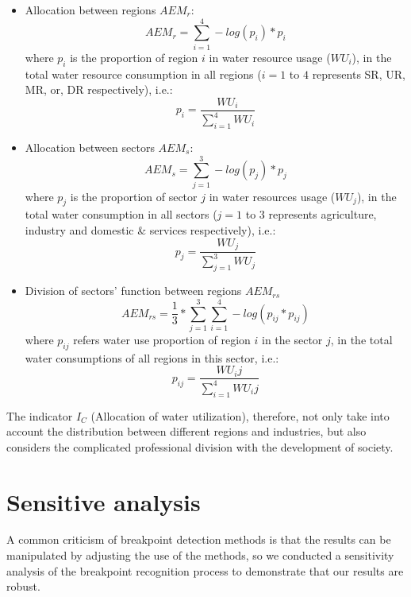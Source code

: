\documentclass[9pt,twoside,lineno]{pnas-new}
\begin{document}
    \begin{itemize}
        \item Allocation between regions $AEM_r$:
            $$ AEM_r = \sum_{i=1}^4 -log(p_{i}) * p_{i} $$
            where $p_i$ is the proportion of region $i$ in water resource usage ($WU_i$), in the total water resource consumption in all regions ($i=1$ to $4$ represents SR, UR, MR, or, DR respectively), i.e.:
            $$ p_i = \frac{WU_i}{\sum_{i=1}^4 WU_i} $$
        \item Allocation between sectors $AEM_s$:
            $$ AEM_s = \sum_{j=1}^3 -log(p_{j}) * p_{j} $$ 
            where $p_j$ is the proportion of sector $j$ in water resources usage ($WU_j$), in the total water consumption in all sectors ($j=1$ to $3$ represents agriculture, industry and domestic \& services respectively), i.e.:
            $$ p_j = \frac{WU_j}{\sum_{j=1}^3 WU_j} $$
        \item Division of sectors' function between regions $AEM_{rs}$
            $$ AEM_{rs} = \frac{1}{3} * \sum_{j=1}^3 \sum_{i=1}^4 -log(p_{ij} * p_{ij})$$
            where $p_{ij}$ refers water use proportion of region $i$ in the sector $j$, in the total water consumptions of all regions in this sector, i.e.: 
            $$ p_{ij} = \frac{WU_ij}{\sum_{i=1}^4 WU_ij} $$
    \end{itemize}

    The indicator $I_C$ (Allocation of water utilization), therefore, not only take into account the distribution between different regions and industries, but also considers the complicated professional division with the development of society. 


\newpage
\section*{Sensitive analysis}
A common criticism of breakpoint detection methods is that the results can be manipulated by adjusting the use of the methods, so we conducted a sensitivity analysis of the breakpoint recognition process to demonstrate that our results are robust. 
\end{document}
